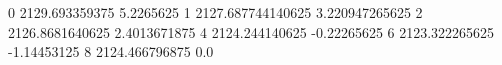 0 2129.693359375 5.2265625
1 2127.687744140625 3.220947265625
2 2126.8681640625 2.4013671875
4 2124.244140625 -0.22265625
6 2123.322265625 -1.14453125
8 2124.466796875 0.0
